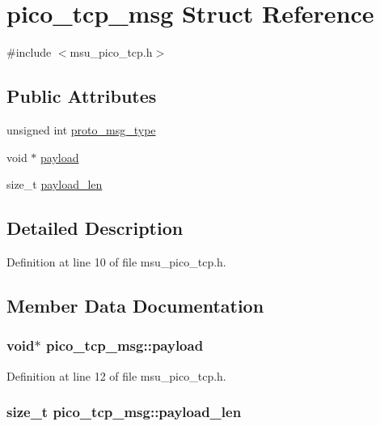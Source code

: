 \hypertarget{structpico__tcp__msg}{\section{pico\-\_\-tcp\-\_\-msg Struct Reference}
\label{structpico__tcp__msg}
}


{\ttfamily \#include $<$msu\-\_\-pico\-\_\-tcp.\-h$>$}

\subsection*{Public Attributes}
\begin{DoxyCompactItemize}
\item 
unsigned int \hyperlink{structpico__tcp__msg_a6d32a0e6f66a430da0402ba2840c3ef9}{proto\-\_\-msg\-\_\-type}
\item 
void $\ast$ \hyperlink{structpico__tcp__msg_aad92ecc2888bc9821b38a4016486e7bd}{payload}
\item 
size\-\_\-t \hyperlink{structpico__tcp__msg_a929fc28e9ca3b9ce53e37ff695438a2a}{payload\-\_\-len}
\end{DoxyCompactItemize}


\subsection{Detailed Description}


Definition at line 10 of file msu\-\_\-pico\-\_\-tcp.\-h.



\subsection{Member Data Documentation}
\hypertarget{structpico__tcp__msg_aad92ecc2888bc9821b38a4016486e7bd}{
\subsubsection[{payload}]{\setlength{\rightskip}{0pt plus 5cm}void$\ast$ pico\-\_\-tcp\-\_\-msg\-::payload}}\label{structpico__tcp__msg_aad92ecc2888bc9821b38a4016486e7bd}


Definition at line 12 of file msu\-\_\-pico\-\_\-tcp.\-h.

\hypertarget{structpico__tcp__msg_a929fc28e9ca3b9ce53e37ff695438a2a}{
\subsubsection[{payload\-\_\-len}]{\setlength{\rightskip}{0pt plus 5cm}size\-\_\-t pico\-\_\-tcp\-\_\-msg\-::payload\-\_\-len}}\label{structpico__tcp__msg_a929fc28e9ca3b9ce53e37ff695438a2a}


